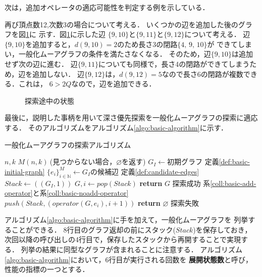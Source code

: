 次は，追加オペレータの適応可能性を判定する例を示している．
\begin{example}
  再び頂点数12,次数3の場合について考える．
  いくつかの辺を追加した後のグラフを図\ref{fig:feasible-edges-example2}に
  示す．図\ref{fig:feasible-edges-example2}に示した辺
  $\{9,10\}$と$\{9,11\}$と$\{9,12\}$について考える．
  辺$\{9,10\}$を追加すると，$d(9,10)=2$のため長さ3の閉路$\{4,\,9,\,10\}$が
  できてしまい，一般化ムーアグラフの条件を満たさなくなる．
  そのため，辺$\{9,10\}$は追加せず次の辺に進む．
  辺$\{9,11\}$についても同様で，長さ4の閉路ができてしまうため，辺を追加しない．
  辺$\{9,12\}$は，$d(9,12)=5$なので長さ6の閉路が複数できる．これは，
  $6>2Q$なので，辺を追加できる．
\end{example}
\begin{figure}
  \centering
  \def\svgwidth{.35\textwidth}
  
  \caption{探索途中の状態}
  \label{fig:feasible-edges-example2}
\end{figure}

最後に，説明した事柄を用いて深さ優先探索を一般化ムーアグラフの探索に適応する．
そのアルゴリズムをアルゴリズム\ref{algo:basic-algorithm}に示す．
\begin{algorithm}[H]
  \caption{一般化ムーアグラフの探索アルゴリズム}
  \label{algo:basic-algorithm}
  \begin{algorithmic}[1]
    \Require $n,k$
    \Ensure $M(n,k)\:$(見つからない場合，$\varnothing$を返す)
    \State $G_I\gets\text{初期グラフ}$
    \Comment 定義\ref{def:basic-initial-graph}
    \State $\{e_i\}_{i\in\mathbb{N}}^M\gets G_I\text{の候補辺}$
    \Comment 定義\ref{def:candidate-edges}
    \State $Stack\gets((G_I,1))$
    \State $G,i\gets pop(Stack)$
    \State \textbf{return} $G$
    \Comment 探索成功
    \EndIf
    \Comment 系\ref{coll:basic-add-operator}と系\ref{coll:basic-noadd-operator}
    \State $push(Stack,(operator(G,e_i),i+1))$
    \EndIf
    \EndFor
    \EndWhile
    \State \textbf{return} $\varnothing$
    \Comment 探索失敗
    \EndProcedure
  \end{algorithmic}
\end{algorithm}
アルゴリズム\ref{algo:basic-algorithm}に手を加えて，一般化ムーアグラフを
列挙することができる．
8行目のグラフ返却の前にスタック($Stack$)を保存しておき，
次回以降の呼び出しの4行目で，保存したスタックから再開することで実現する．
列挙の結果に同型なグラフが含まれることに注意する．
アルゴリズム\ref{algo:basic-algorithm}において，6行目が実行される回数を
\textbf{展開状態数}と呼び，性能の指標の一つとする．

